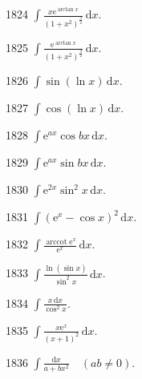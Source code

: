 \begin{prob}[S]{1824}
$\int \frac{x\mathrm{e}^{\arctan x}}{(1 + x^2)^{\frac{3}{2}}}\,\mathrm{d}x$.
\end{prob}

\begin{prob}[S]{1825}
$\int \frac{\mathrm{e}^{\arctan x}}{(1 + x^2)^{\frac{3}{2}}}\,\mathrm{d}x$.
\end{prob}

\begin{prob}[S]{1826}
$\int \sin(\ln x)\,\mathrm{d}x$.
\end{prob}

\begin{prob}[S]{1827}
$\int \cos(\ln x)\,\mathrm{d}x$.
\end{prob}

\begin{prob}[S]{1828}
$\int \mathrm{e}^{ax} \cos bx\,\mathrm{d}x$.
\end{prob}

\begin{prob}[S]{1829}
$\int \mathrm{e}^{ax} \sin bx\,\mathrm{d}x$.
\end{prob}

\begin{prob}[S]{1830}
$\int \mathrm{e}^{2x} \sin^2 x\,\mathrm{d}x$.
\end{prob}

\begin{prob}[S]{1831}
$\int (\mathrm{e}^x - \cos x)^2\,\mathrm{d}x$.
\end{prob}

\begin{prob}[S]{1832}
$\int \frac{\operatorname{arccot} \mathrm{e}^x}{\mathrm{e}^x}\,\mathrm{d}x$.
\end{prob}

\begin{prob}[S]{1833}
$\int \frac{\ln(\sin x)}{\sin^2 x}\,\mathrm{d}x$.
\end{prob}

\begin{prob}[S]{1834}
$\int \frac{x\,\mathrm{d}x}{\cos^2 x}$.
\end{prob}

\begin{prob}[S]{1835}
$\int \frac{x\mathrm{e}^x}{(x + 1)^2}\,\mathrm{d}x$.
\end{prob}


\begin{prob}[S]{1836}
$\int \frac{\mathrm{d}x}{a + bx^2} \quad (ab \neq 0)$.
\end{prob}

